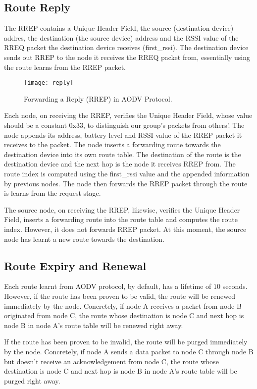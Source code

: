 \subsection{Route Reply}
The RREP contains a Unique Header Field, the source (destination device) addres, the destination (the source device) address and the RSSI value of the RREQ packet the destination device receives (first\_rssi).
The destination device sends out RREP to the node it receives the RREQ packet from, essentially using the route learns from the RREP packet.

\begin{figure}
\centering
\texttt{[image: reply]}
\caption{Forwarding a Reply (RREP) in AODV Protocol.}
\label{fig:request}
\end{figure}

Each node, on receiving the RREP, verifies the Unique Header Field, whose value should be a constant 0x33, to distinguish our group's packets from others'.
The node appends its address, battery level and RSSI value of the RREP packet it receives to the packet.
The node inserts a forwarding route towards the destination device into its own route table.
The destination of the route is the destination device and the next hop is the node it receives RREP from.
The route index is computed using the first\_rssi value and the appended information by previous nodes.
The node then forwards the RREP packet through the route is learns from the request stage.

The source node, on receiving the RREP, likewise, verifies the Unique Header Field, inserts a forwarding route into the route table and computes the route index.
However, it does not forwards RREP packet.
At this moment, the source node has learnt a new route towards the destination.

\subsection{Route Expiry and Renewal}
Each route learnt from AODV protocol, by default, has a lifetime of $10$ seconds.
However, if the route has been proven to be valid, the route will be renewed immediately by the node.
Concretely, if node A receives a packet from node B originated from node C, the route whose destination is node C and next hop is node B in node A's route table will be renewed right away.

If the route has been proven to be invalid, the route will be purged immediately by the node.
Concretely, if node A sends a data packet to node C through node B but doesn't receive an acknowledgement from node C, the route whose destination is node C and next hop is node B in node A's route table will be purged right away.

